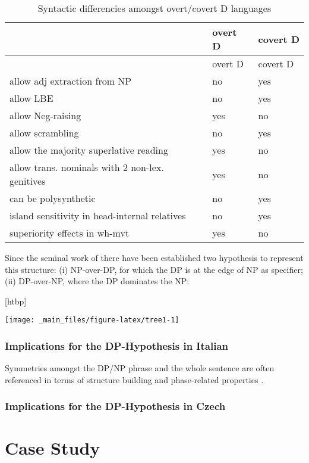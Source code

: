 \documentclass[a4paper,twoside,12pt,chapterprefix=false,listof=flat]{scrartcl}
\makeatletter
\def\fps@figure{htbp}
\renewenvironment{figure}[1][\fps@figure]{
  \edef\@tempa{\noexpand\@float{figure}[#1]} 
  \@tempa
  \sffamily
}{
  \end@float
}
\theoremstyle{plain} %
\theoremstyle{definition}
\theoremstyle{remark}
\makeatother
\begin{document}
\begin{longtable}[]{@{}lll@{}}
\caption{Syntactic differencies amongst overt/covert D
languages}\tabularnewline
\toprule
& overt D & covert D\tabularnewline
\midrule
\endfirsthead
\toprule
& overt D & covert D\tabularnewline
\midrule
\endhead
allow adj extraction from NP & no & yes\tabularnewline
allow LBE & no & yes\tabularnewline
allow Neg-raising & yes & no\tabularnewline
allow scrambling & no & yes\tabularnewline
allow the majority superlative reading & yes & no\tabularnewline
allow trans. nominals with 2 non-lex. genitives & yes &
no\tabularnewline
can be polysynthetic & no & yes\tabularnewline
island sensitivity in head-internal relatives & no & yes\tabularnewline
superiority effects in wh-mvt & yes & no\tabularnewline
\bottomrule
\end{longtable}

Since the seminal work of \citep{abney1987} there have been established
two hypothesis to represent this structure: (i) NP-over-DP, for which
the DP is at the edge of NP as specifier; (ii) DP-over-NP, where the DP
dominates the NP:

\begin{figure}

{\centering \texttt{[image: \_main\_files/figure-latex/tree1-1]} 

}

\caption{Structural comparison between NP-over-DP and DP-over-NP Hypotheses}\label{fig:tree1}
\end{figure}

\subsubsection{Implications for the DP-Hypothesis in
Italian}\label{implications-for-the-dp-hypothesis-in-italian}

Symmetries amongst the DP/NP phrase and the whole sentence are often
referenced in terms of structure building and phase-related properties
\citep{chomsky2013, chomsky2015}.

\subsubsection{Implications for the DP-Hypothesis in
Czech}\label{implications-for-the-dp-hypothesis-in-czech}

\section{Case Study}\label{sec:caseStudy}
\end{document}
